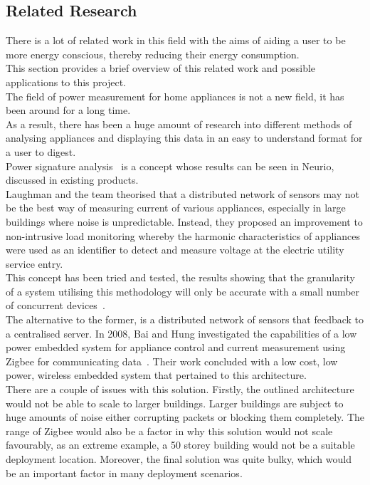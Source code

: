 \documentclass[draft,preprint,12pt,3p]{elsarticle}
\begin{document}
\subsection{Related Research}
There is a lot of related work in this field with the aims of aiding a user to be more energy conscious, thereby reducing their energy consumption.\\
This section provides a brief overview of this related work and possible applications to this project.\\[5pt]
The field of power measurement for home appliances is not a new field, it has been around for a long time.\\ As a result, there has been a huge amount of research into different methods of analysing appliances and displaying this data in an easy to understand format for a user to digest.\\
Power signature analysis~\cite{laughman2003power} is a concept whose results can be seen in Neurio, discussed in existing products.\\ 
Laughman and the team theorised that a distributed network of sensors may not be the best way of measuring current of various appliances, especially in large buildings where noise is unpredictable. Instead, they proposed an improvement to non-intrusive load monitoring whereby the harmonic characteristics of appliances were used as an identifier to detect and measure voltage at the electric utility service entry.\\
This concept has been tried and tested, the results showing that the granularity of a system utilising this methodology will only be accurate with a small number of concurrent devices~\cite{liang2010load}.\\
The alternative to the former, is a distributed network of sensors that feedback to a centralised server. In 2008, Bai and Hung investigated the capabilities of a low power embedded system for appliance control and current measurement using Zigbee for communicating data~\cite{bai2008remote}. Their work concluded with a low cost, low power, wireless embedded system that pertained to this architecture.\\
There are a couple of issues with this solution. Firstly, the outlined architecture would not be able to scale to larger buildings. Larger buildings are subject to huge amounts of noise either corrupting packets or blocking them completely. The range of Zigbee would also be a factor in why this solution would not scale favourably, as an extreme example, a 50 storey building would not be a suitable deployment location. Moreover, the final solution was quite bulky, which would be an important factor in many deployment scenarios.\\ 
\end{document}
